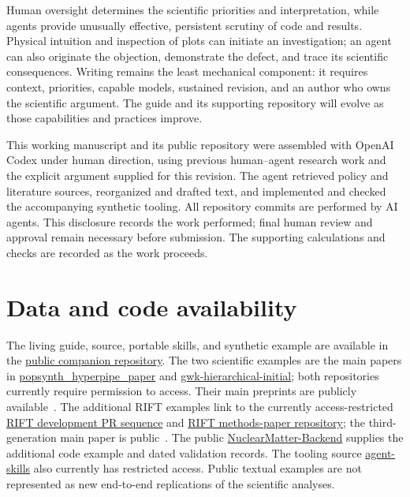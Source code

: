\documentclass[aps,prd,reprint,nofootinbib]{revtex4-2}
\begin{document}
Human oversight determines the scientific priorities and interpretation, while agents provide unusually effective, persistent scrutiny of code and results. Physical intuition and inspection of plots can initiate an investigation; an agent can also originate the objection, demonstrate the defect, and trace its scientific consequences. Writing remains the least mechanical component: it requires context, priorities, capable models, sustained revision, and an author who owns the scientific argument. The guide and its supporting repository will evolve as those capabilities and practices improve.

\begin{acknowledgments}
This working manuscript and its public repository were assembled with OpenAI Codex under human direction, using previous human--agent research work and the explicit argument supplied for this revision. The agent retrieved policy and literature sources, reorganized and drafted text, and implemented and checked the accompanying synthetic tooling. All repository commits are performed by AI agents. This disclosure records the work performed; final human review and approval remain necessary before submission. The supporting calculations and checks are recorded as the work proceeds.
\end{acknowledgments}

\section*{Data and code availability}
The living guide, source, portable skills, and synthetic example are available in the \href{https://github.com/oshaughnessy-junior/whitepaper-transparent-agentic-science}{public companion repository}. The two scientific examples are the main papers in \href{https://github.com/oshaughnessy-junior/popsynth_hyperpipe_paper}{popsynth\_hyperpipe\_paper} and \href{https://github.com/oshaughnessy-junior/gwk-hierarchical-initial}{gwk-hierarchical-initial}; both repositories currently require permission to access. Their main preprints are publicly available~\cite{SyntheticUniverses,HierarchicalMethods}. The additional RIFT examples link to the currently access-restricted \href{https://github.com/oshaughnessy-junior/research-projects-RIT/pulls}{RIFT development PR sequence} and \href{https://github.com/oshaughnessy-junior/RIFT_roboto_paper}{RIFT methods-paper repository}; the third-generation main paper is public~\cite{RIFTThreeG}. The public \href{https://github.com/oshaughnessy-junior/NuclearMatter-Backend}{NuclearMatter-Backend} supplies the additional code example and dated validation records. The tooling source \href{https://github.com/oshaughnessy-junior/agent-skills}{agent-skills} also currently has restricted access. Public textual examples are not represented as new end-to-end replications of the scientific analyses.
\end{document}
